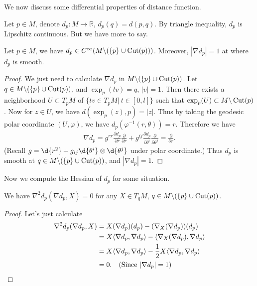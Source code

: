 We now discuss some differential properties of distance function.

Let $p\in M$, denote $d_p:M\to\mathbb{R}$, $d_p(q)=d(p,q)$.
By triangle inequality, $d_p$ is Lipschitz continuous.
But we have more to say.
\begin{prop}\label{dp smooth}
    Let $p\in M$, we have $d_p\in C^\infty(M\backslash(\{p\}\cup\operatorname{Cut}(p)))$.
    Moreover, $|\nabla d_p|=1$ at where $d_p$ is smooth.
\end{prop}
\begin{proof}
    We just need to calculate $\nabla d_p$ in $M\backslash(\{p\}\cup\operatorname{Cut}(p))$.
    Let $q\in M\backslash(\{p\}\cup\operatorname{Cut}(p))$, and $\exp_p(lv)=q$, $|v|=1$.
    Then there exists a neighborhood $U\subset T_pM$ of $\{tv\in T_pM|\ t\in[0,l]\}$ such that $\exp_p(U)\subset M\backslash\operatorname{Cut}(p)$.
    Now for $z\in U$, we have $d(\exp_p(z),p)=|z|$.
    Thus by taking the geodesic polar coordinate $(U,\varphi)$, we have $d_p(\varphi^{-1}(r,\theta))=r$.
    Therefore we have
    \begin{align*}
        \nabla d_p=g^{rr}\frac{\partial{d_p}}{\partial{r}}\frac{\partial{}}{\partial{r}}+g^{ij}\frac{\partial{d_p}}{\partial{\theta^i}}\frac{\partial{}}{\partial{\theta^j}}=\frac{\partial{}}{\partial{r}}.
    \end{align*}
    (Recall $g=\d{r^2}+g_{ij}\d{\theta^i}\otimes\d{\theta^j}$ under polar coordinate.)
    Thus $d_p$ is smooth at $q\in M\backslash(\{p\}\cup\operatorname{Cut}(p))$, and $|\nabla d_p|=1$.
\end{proof}

Now we compute the Hessian of $d_p$ for some situation.

\begin{prop}\label{hess dp in tangential}
    We have $\nabla^2d_p(\nabla d_p,X)=0$ for any $X\in T_qM$, $q\in M\backslash(\{p\}\cup\operatorname{Cut}(p))$.
\end{prop}
\begin{proof}
    Let's just calculate
    \begin{align*}
        \nabla^2d_p(\nabla d_p,X)&=X(\nabla d_p)(d_p)-(\nabla_X(\nabla d_p))(d_p)\\
        &=X\langle\nabla d_p,\nabla d_p\rangle-\langle\nabla_X(\nabla d_p),\nabla d_p\rangle\\
        &=X\langle\nabla d_p,\nabla d_p\rangle-\frac{1}{2}X\langle\nabla d_p,\nabla d_p\rangle\\
        &=0.\quad\text{(Since $|\nabla d_p|=1$)}\qedhere
    \end{align*}
\end{proof}

